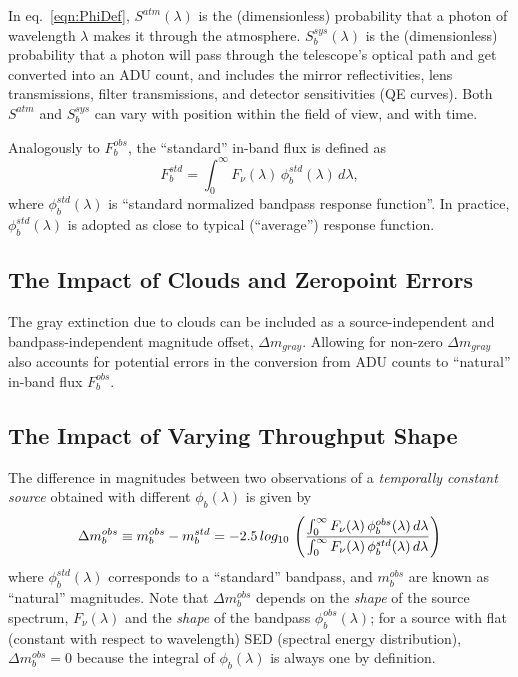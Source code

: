 \documentclass[12pt,preprint]{aastex}
\begin{document}
In eq.~\ref{eqn:PhiDef}, $S^{atm}(\lambda)$ is the (dimensionless) probability that a photon of 
wavelength $\lambda$ makes it through the atmosphere. $S_b^{sys}(\lambda)$ is the 
(dimensionless) probability that a photon will pass through the telescope's optical path and get
converted into an ADU count, and includes the mirror reflectivities, lens transmissions, filter
transmissions, and detector sensitivities (QE curves). Both $S^{atm}$ and $S_b^{sys}$ can vary 
with position within the field of view, and with time. 

Analogously to $F_b^{obs}$, the ``standard'' in-band flux is defined as 
\begin{equation}
\label{eqn:Fstd}
     F_b^{std} = \int_0^\infty {F_\nu(\lambda) \,\phi_b^{std}(\lambda) \, d\lambda}, 
\end{equation}
where $\phi_b^{std}(\lambda)$ is ``standard normalized bandpass response function''.  
In practice, $\phi_b^{std}(\lambda)$ is adopted as close to typical (``average'') response 
function. 


\subsection{The Impact of Clouds and Zeropoint Errors} 

The gray extinction due to clouds can be included as a source-independent and bandpass-independent
magnitude offset, $\Delta m_{gray}$. Allowing for non-zero $\Delta m_{gray}$ also accounts for potential 
errors in the conversion from ADU counts to ``natural'' in-band flux $F_b^{obs}$. 


\subsection{The Impact of Varying Throughput Shape} 

The difference in magnitudes between two observations of a {\it temporally constant source} obtained 
with different $\phi_b(\lambda)$ is given by 
\begin{equation}
\label{eqn:Delta_m}
\Delta m_b^{obs}  \equiv m_b^{obs} - m_b^{std}  =  -2.5 \, log_{10} \,  \left( { \int_0^\infty {F_\nu(\lambda) \,
    \phi_b^{obs}(\lambda) \, d\lambda} \over \int_0^\infty {F_\nu(\lambda) \,
    \phi_b^{std}(\lambda) \, d\lambda}} \right)
\end{equation}
where $\phi_b^{std}(\lambda)$ corresponds to a ``standard'' bandpass, and $m_b^{obs}$ are
known as ``natural'' magnitudes. Note that $\Delta m_b^{obs}$ depends on the {\it shape} of the 
source spectrum, $F_\nu(\lambda)$ and the {\it shape} of the bandpass
$\phi_b^{obs}(\lambda)$; for a source with flat (constant with respect to wavelength) SED (spectral
energy distribution), $\Delta m_b^{obs}=0$ because the integral of $\phi_b(\lambda)$ is always one
by definition. 
\end{document}
